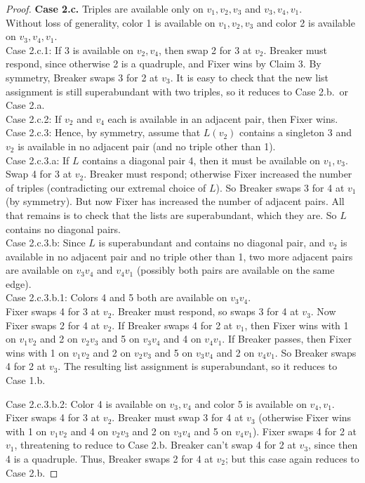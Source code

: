 \documentclass[12pt,reqno]{amsart}
\theoremstyle{plain}
\theoremstyle{definition}
\theoremstyle{remark}
\begin{document}
\begin{proof}
\noindent
\textbf{Case 2.c.} Triples are available only on $v_1,v_2,v_3$ and
$v_3,v_4,v_1$.\\
Without loss of generality, color 1 is available on $v_1,v_2,v_3$ and color 2
is available on $v_3,v_4,v_1$.\\
Case 2.c.1: If 3 is available on $v_2, v_4$, then swap 2 for 3 at $v_2$. 
Breaker must respond, since otherwise 2 is a quadruple, and Fixer wins by Claim
3.  By symmetry, Breaker swaps 3 for 2 at $v_3$.  It is easy to check that the
new list assignment is still superabundant with two triples, so it reduces to
Case 2.b.~or Case 2.a.\\
Case 2.c.2: 
If $v_2$ and $v_4$ each is available in an adjacent pair, then Fixer wins.  \\
Case 2.c.3: Hence, by
symmetry, assume that $L(v_2)$ contains a singleton 3 and $v_2$ is available in
no adjacent pair (and no triple other than 1).  \\
Case 2.c.3.a: If $L$ contains a
diagonal pair 4, then it must be available on $v_1,v_3$.  Swap 4 for 3 at $v_2$.
Breaker must respond; otherwise Fixer increased the number of triples
(contradicting our extremal choice of $L$).  So Breaker swaps 3 for 4 at $v_1$
(by symmetry).  But now Fixer has increased the number of adjacent pairs.  All
that remains is to check that the lists are
superabundant, which they are.  So $L$ contains no diagonal pairs.  \\
Case 2.c.3.b:  Since $L$ is superabundant and contains no diagonal pair, and
$v_2$ is available in no adjacent pair and no triple other than 1,
two more adjacent pairs are available on $v_3v_4$ and $v_4v_1$
(possibly both pairs are available on the same edge).\\
Case 2.c.3.b.1: Colors 4 and 5 both are available on $v_3v_4$.\\
Fixer swaps 4 for 3 at $v_2$.  Breaker must respond, so swaps 3 for 4 at $v_3$.
Now Fixer swaps 2 for 4 at $v_2$.  If Breaker swaps 4 for 2 at $v_1$, then Fixer
wins with 1 on $v_1v_2$ and 2 on $v_2v_3$ and 5 on $v_3v_4$ and 4 on $v_4v_1$.
If Breaker passes, then Fixer wins with 1 on $v_1v_2$ and 2 on $v_2v_3$ and 5 on
$v_3v_4$ and 2 on $v_4v_1$.  So Breaker swaps 4 for 2 at $v_3$.
The resulting list assignment is superabundant, so it reduces to Case 1.b.

\noindent
Case 2.c.3.b.2: Color 4 is available on $v_3,v_4$ and color 5 is available on
$v_4,v_1$.\\
Fixer swaps 4 for 3 at $v_2$.  Breaker must swap 3 for 4 at $v_3$ (otherwise
Fixer wins with 1 on $v_1v_2$ and 4 on $v_2v_3$ and 2 on $v_3v_4$ and 5 on
$v_4v_1$).  Fixer swaps 4 for 2 at $v_1$, threatening to reduce to Case 2.b.
Breaker can't swap 4 for 2 at $v_3$, since then 4 is a quadruple.  Thus, Breaker
swaps 2 for 4 at $v_2$; but this case again reduces to Case 2.b.
%
\end{proof}
\end{document}
